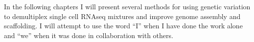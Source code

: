 \par{
In the following chapters I will present several methods for using genetic variation to demultiplex single cell RNAseq mixtures and improve genome assembly and scaffolding. I will attempt to use the word ``I'' when I have done the work alone and ``we'' when it was done in collaboration with others.
}

